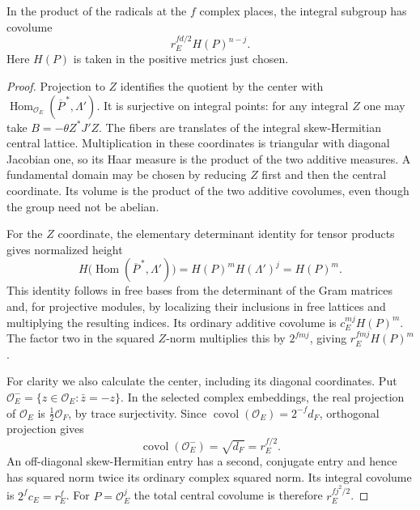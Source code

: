 \begin{lemma}\label{rv-radical-covolume}
In the product of the radicals at the $f$ complex places,
the integral subgroup has covolume
\begin{equation}\label{rv-radical-formula}
                  r_E^{fd/2}H(P)^{n-j}.
\end{equation}
Here $H(P)$ is taken in the positive metrics just chosen.
\end{lemma}
\begin{proof}
Projection to $Z$ identifies the quotient by the center
with $\operatorname{Hom}_{\mathcal O_E}
(\overline P^{\,*},\Lambda')$.  It is surjective on
integral points: for any integral $Z$ one may take
$B=-\theta Z^*J'Z$.  The fibers are translates of the
integral skew-Hermitian central lattice.  Multiplication
in these coordinates is triangular with diagonal
Jacobian one, so its Haar measure is the product of
the two additive measures.  A fundamental domain may
be chosen by reducing $Z$ first and then the central
coordinate.  Its volume is the product of the two
additive covolumes, even though the group need not
be abelian.

For the $Z$ coordinate, the elementary determinant
identity for tensor products gives normalized height
\[
 H\bigl(\operatorname{Hom}(\overline P^{\,*},\Lambda')\bigr)
                =H(P)^m H(\Lambda')^j=H(P)^m.
\]
This identity follows in free bases from the determinant
of the Gram matrices and, for projective modules, by
localizing their inclusions in free lattices and
multiplying the resulting indices.
Its ordinary additive covolume is
$c_E^{mj}H(P)^m$.
The factor two in the squared $Z$-norm multiplies this
by $2^{fmj}$, giving $r_E^{fmj}H(P)^m$.

For clarity we also calculate the center, including its
diagonal coordinates.  Put
$\mathcal O_E^-=\{z\in\mathcal O_E:\bar z=-z\}$.
In the selected complex embeddings,
the real projection of $\mathcal O_E$ is
$\tfrac12\mathcal O_F$, by trace surjectivity.
Since $\operatorname{covol}(\mathcal O_E)
=2^{-f}d_F$, orthogonal projection gives
\[
              \operatorname{covol}(\mathcal O_E^-)
                         =\sqrt{d_F}=r_E^{f/2}.
\]
An off-diagonal skew-Hermitian entry has a second,
conjugate entry and hence has squared norm twice its
ordinary complex squared norm.  Its integral
covolume is $2^fc_E=r_E^f$.  For $P=\mathcal O_E^j$
the total central covolume is therefore
$r_E^{f j^2/2}$.


\end{proof}
